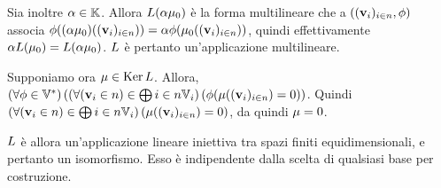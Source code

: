 \par Sia inoltre $\alpha \in \mathbb{K}$. Allora $L(\alpha\mu_0)$ \`e la forma multilineare che a $((\mathbf{v}_i)_{i \in n},\phi)$ associa $\phi((\alpha \mu_0)((\mathbf{v}_i)_{i \in n})) = \alpha \phi(\mu_0((\mathbf{v}_i)_{i \in n}))$, quindi effettivamente $\alpha L(\mu_0) = L(\alpha \mu_0)$. $L$ \`e pertanto un'applicazione multilineare.
\par Supponiamo ora $\mu \in \operatorname{Ker}{L}$. Allora, $\left ( \forall \phi \in {{\mathbb{V}}^*} \right ) \left ( \left ( \forall (\mathbf{v}_i \in n) \in \bigoplus{i \in n} \mathbb{V}_i \right ) \left ( \phi(\mu((\mathbf{v}_i)_{i \in n}) = 0 \right ) \right )$. Quindi $\left ( \forall (\mathbf{v}_i \in n) \in \bigoplus{i \in n} \mathbb{V}_i \right ) \left ( \mu((\mathbf{v}_i)_{i \in n}) = 0 \right )$, da quindi $\mu = 0$.
\par $L$ \`e allora un'applicazione lineare iniettiva tra spazi finiti equidimensionali, e pertanto un isomorfismo. Esso \`e indipendente dalla scelta di qualsiasi base per costruzione. \EndProof
